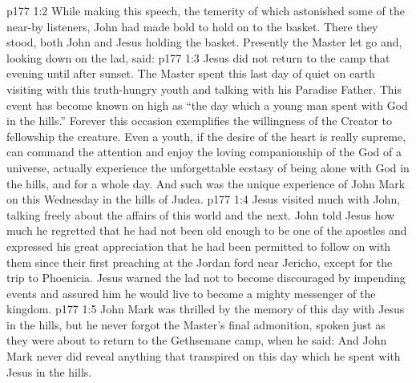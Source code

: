 \vs p177 1:2 While making this speech, the temerity of which astonished some of the near-by listeners, John had made bold to hold on to the basket. There they stood, both John and Jesus holding the basket. Presently the Master let go and, looking down on the lad, said: 
\vs p177 1:3 Jesus did not return to the camp that evening until after sunset. The Master spent this last day of quiet on earth visiting with this truth\hyp{}hungry youth and talking with his Paradise Father. This event has become known on high as “the day which a young man spent with God in the hills.” Forever this occasion exemplifies the willingness of the Creator to fellowship the creature. Even a youth, if the desire of the heart is really supreme, can command the attention and enjoy the loving companionship of the God of a universe, actually experience the unforgettable ecstasy of being alone with God in the hills, and for a whole day. And such was the unique experience of John Mark on this Wednesday in the hills of Judea.
\vs p177 1:4 Jesus visited much with John, talking freely about the affairs of this world and the next. John told Jesus how much he regretted that he had not been old enough to be one of the apostles and expressed his great appreciation that he had been permitted to follow on with them since their first preaching at the Jordan ford near Jericho, except for the trip to Phoenicia. Jesus warned the lad not to become discouraged by impending events and assured him he would live to become a mighty messenger of the kingdom.
\vs p177 1:5 John Mark was thrilled by the memory of this day with Jesus in the hills, but he never forgot the Master’s final admonition, spoken just as they were about to return to the Gethsemane camp, when he said:  And John Mark never did reveal anything that transpired on this day which he spent with Jesus in the hills.
